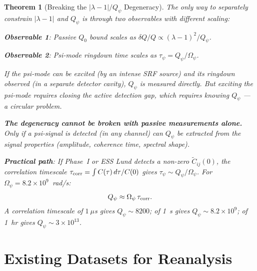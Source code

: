 \documentclass[11pt]{article}
\newcommand{\lam}{\lambda}
\newcommand{\Opsi}{\Omega_\psi}
\newcommand{\ee}[1]{\times 10^{#1}}
\newcommand{\Qpsi}{Q_\psi}
\newcommand{\lbone}{|\lam - 1|}
\newtheorem{theorem}{Theorem}[section]
\theoremstyle{definition}
\theoremstyle{remark}
\begin{document}
\begin{theorem}[Breaking the $\lbone/\Qpsi$ Degeneracy]
\label{thm:breaking_degeneracy}
The only way to separately constrain $\lbone$ and $\Qpsi$ is through
two observables with \emph{different} scaling:

\textbf{Observable 1}: Passive $Q_0$ bound scales as
$\delta Q/Q \propto (\lam-1)^2/\Qpsi$.

\textbf{Observable 2}: Psi-mode ringdown time scales as
$\tau_\psi = \Qpsi/\Opsi$.

If the psi-mode can be excited (by an intense SRF source) and its
ringdown observed (in a separate detector cavity), $\Qpsi$ is measured
directly. But exciting the psi-mode requires closing the active
detection gap, which requires knowing $\Qpsi$ --- a circular problem.

\textbf{The degeneracy cannot be broken with passive measurements
alone.} Only if a psi-signal is detected (in any channel) can $\Qpsi$
be extracted from the signal properties (amplitude, coherence time,
spectral shape).

\textbf{Practical path}: If Phase~I or ESS Lund detects a non-zero
$\tilde{C}_{ij}(0)$, the correlation timescale
$\tau_{\rm corr} = \int C(\tau)\,d\tau / C(0)$ gives
$\tau_\psi \sim \Qpsi/\Opsi$. For $\Opsi = 8.2\ee{9}$~rad/s:
\begin{equation}
\Qpsi \approx \Opsi\,\tau_{\rm corr}.
\end{equation}
A correlation timescale of $1~\mu$s gives $\Qpsi \sim 8200$;
of 1~s gives $\Qpsi \sim 8.2\ee{9}$; of 1~hr gives
$\Qpsi \sim 3\ee{13}$.
\end{theorem}

\section{Existing Datasets for Reanalysis}
\label{sec:existing_datasets}
\end{document}
